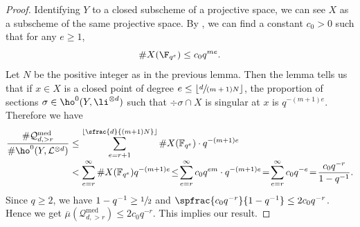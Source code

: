 \begin{proof}
Identifying $Y$ to a closed subscheme of a projective space, we can see $X$ as a subscheme of the same projective space. By \cite{LW54}, we can find a constant $c_0>0$ such that for any $e\geq 1$,\vspace*{-3pt}
\[
\#X(\F_{q^e})\leq c_0 q^{me}.
\]
Let $N$ be the positive integer as in the previous lemma. Then the lemma tells us that if $x\in X$ is a closed point of degree $e\leq \lfloor \sfrac{d}{(m+1)N}\rfloor$, the proportion of sections $\sigma\in \ho^0(Y, \li^{\otimes d})$ such that $\div \sigma\cap X$ is singular at $x$ is $q^{-(m+1)e}$. Therefore we have\vspace*{-3pt}
\begin{align*}
\frac{\#\mathcal{Q}_{d, >r}^{\mathrm{med}}}{\# \ho^0(Y, \mathcal{L}^{\otimes d})}
&\leq \sum_{e=r+1}^{\lfloor\sfrac{d}{(m+1)N}\rfloor}\#X(\mathbb{F}_{q^e})\cdot q^{-(m+1)e} \\[-3pt]
&< \sum_{e=r}^{\infty}\#X(\mathbb{F}_{q^e})q^{-(m+1)e} \!\leq\! \sum_{e=r}^{\infty}c_0q^{em}\cdot q^{-(m+1)e}\!=\!\sum_{e=r}^{\infty}c_0q^{-e}\!=\!\frac{c_0q^{-r}}{1-q^{-1}}.
\end{align*}
Since $q\geq 2$, we have $1-q^{-1}\geq \sfrac{1}{2}$ and $\spfrac{c_0q^{-r}}{1-q^{-1}}\leq 2c_0q^{-r}$. Hence we get $\overline{\mu}(\mathcal{Q}_{d, >r}^{\mathrm{med}})\leq 2c_0q^{-r}$. This implies our result.
\end{proof}



